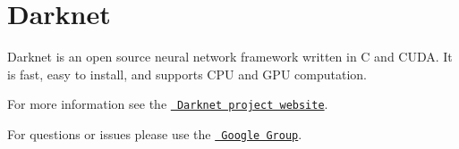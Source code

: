 

\section*{Darknet}

Darknet is an open source neural network framework written in C and C\+U\+DA. It is fast, easy to install, and supports C\+PU and G\+PU computation.

For more information see the \href{http://pjreddie.com/darknet}{\texttt{ Darknet project website}}.

For questions or issues please use the \href{https://groups.google.com/forum/\#!forum/darknet}{\texttt{ Google Group}}. 